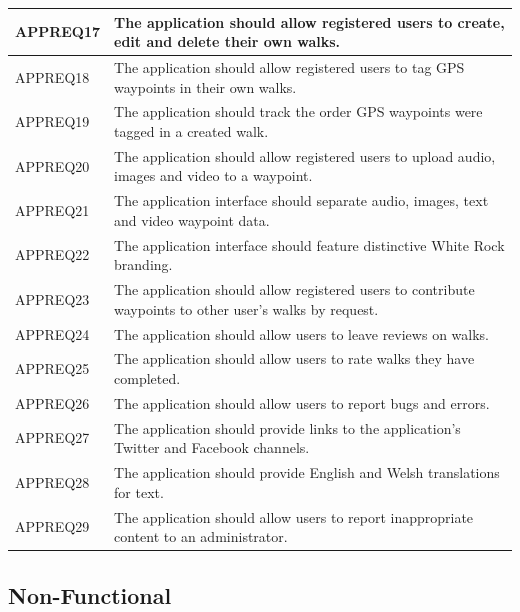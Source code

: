 \documentclass[11pt,a4paper]{article}
\begin{document}
\begin{longtable}{|p{2.5cm}p{13cm}|}
APPREQ17 & The application should allow registered users to create, edit and delete their own walks. \\ \hline
APPREQ18 & The application should allow registered users to tag GPS waypoints in their own walks. \\ \hline
APPREQ19 & The application should track the order GPS waypoints were tagged in a created walk. \\ \hline
APPREQ20 & The application should allow registered users to upload audio, images and video to a waypoint. \\ \hline
APPREQ21 & The application interface should separate audio, images, text and video waypoint data. \\ \hline
APPREQ22 & The application interface should feature distinctive White Rock branding. \\ \hline
APPREQ23 & The application should allow registered users to contribute waypoints to other user's walks by request. \\ \hline
APPREQ24 & The application should allow users to leave reviews on walks. \\ \hline
APPREQ25 & The application should allow users to rate walks they have completed. \\ \hline
APPREQ26 & The application should allow users to report bugs and errors. \\ \hline
APPREQ27 & The application should provide links to the application's Twitter and Facebook channels. \\ \hline
APPREQ28 & The application should provide English and Welsh translations for text. \\ \hline
APPREQ29 & The application should allow users to report inappropriate content to an administrator. \\ \hline

\end{longtable}

\subsection{Non-Functional}
\label{sec:non-func-reqs}
\end{document}

